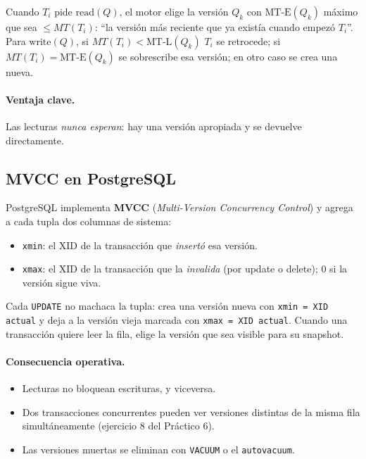 \documentclass[11pt,a4paper]{article}
\begin{document}
Cuando $T_i$ pide $\mathrm{read}(Q)$, el motor elige la versión $Q_k$
con $\mathrm{MT\text{-}E}(Q_k)$ máximo que sea $\le MT(T_i)$: ``la
versión más reciente que ya existía cuando empezó $T_i$''. Para
$\mathrm{write}(Q)$, si $MT(T_i) < \mathrm{MT\text{-}L}(Q_k)$ $T_i$ se
retrocede; si $MT(T_i) = \mathrm{MT\text{-}E}(Q_k)$ se sobrescribe esa
versión; en otro caso se crea una nueva.

\paragraph{Ventaja clave.} Las lecturas \emph{nunca esperan}: hay una
versión apropiada y se devuelve directamente.

\subsection{MVCC en PostgreSQL}

PostgreSQL implementa \textbf{MVCC} (\emph{Multi-Version Concurrency
Control}) y agrega a cada tupla dos columnas de sistema:

\begin{itemize}
    \item \texttt{xmin}: el XID de la transacción que \emph{insertó}
    esa versión.
    \item \texttt{xmax}: el XID de la transacción que la \emph{invalida}
    (por update o delete); $0$ si la versión sigue viva.
\end{itemize}

Cada \texttt{UPDATE} no machaca la tupla: crea una versión nueva con
\texttt{xmin = XID actual} y deja a la versión vieja marcada con
\texttt{xmax = XID actual}. Cuando una transacción quiere leer la fila,
elige la versión que sea visible para su snapshot.

\paragraph{Consecuencia operativa.}
\begin{itemize}
    \item Lecturas no bloquean escrituras, y viceversa.
    \item Dos transacciones concurrentes pueden ver versiones distintas
    de la misma fila simultáneamente (ejercicio 8 del Práctico 6).
    \item Las versiones muertas se eliminan con \texttt{VACUUM} o el
    \texttt{autovacuum}.
\end{itemize}
\end{document}
